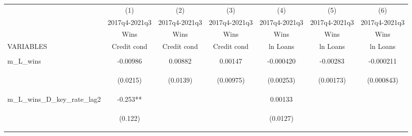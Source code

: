 \documentclass[]{article}
\begin{document}
\begin{center}
\begin{tabular}{lcccccc} \hline
 & (1) & (2) & (3) & (4) & (5) & (6) \\
 & 2017q4-2021q3 & 2017q4-2021q3 & 2017q4-2021q3 & 2017q4-2021q3 & 2017q4-2021q3 & 2017q4-2021q3 \\
 & Wins & Wins & Wins & Wins & Wins & Wins \\
VARIABLES & Credit cond & Credit cond & Credit cond & ln Loans & ln Loans & ln Loans \\ \hline
\vspace{4pt} & \begin{footnotesize}\end{footnotesize} & \begin{footnotesize}\end{footnotesize} & \begin{footnotesize}\end{footnotesize} & \begin{footnotesize}\end{footnotesize} & \begin{footnotesize}\end{footnotesize} & \begin{footnotesize}\end{footnotesize} \\
m\_L\_wins & -0.00986 & 0.00882 & 0.00147 & -0.000420 & -0.00283 & -0.000211 \\
\vspace{4pt} & \begin{footnotesize}(0.0215)\end{footnotesize} & \begin{footnotesize}(0.0139)\end{footnotesize} & \begin{footnotesize}(0.00975)\end{footnotesize} & \begin{footnotesize}(0.00253)\end{footnotesize} & \begin{footnotesize}(0.00173)\end{footnotesize} & \begin{footnotesize}(0.000843)\end{footnotesize} \\
m\_L\_wins\_D\_key\_rate\_lag2 & -0.253** &  &  & 0.00133 &  &  \\
\vspace{4pt} & \begin{footnotesize}(0.122)\end{footnotesize} & \begin{footnotesize}\end{footnotesize} & \begin{footnotesize}\end{footnotesize} & \begin{footnotesize}(0.0127)\end{footnotesize} & \begin{footnotesize}\end{footnotesize} & \begin{footnotesize}\end{footnotesize} \\

\end{tabular}
\end{center}
\end{document}
